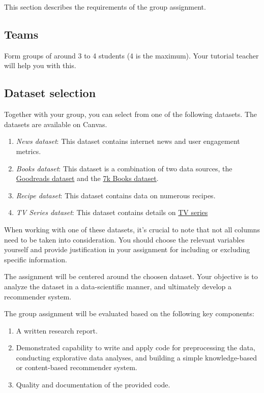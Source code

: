 This section describes the requirements of the group assignment. 

\subsection*{Teams}

Form groups of around 3 to 4 students (4 is the maximum). Your tutorial teacher will help you with this.

\subsection*{Dataset selection}
Together with your group, you can select from one of the following datasets. The datasets are available on Canvas. 

\begin{enumerate}
	\item \emph{News dataset}: This dataset contains internet news and user engagement metrics. 
 	\item \emph{Books dataset}: This dataset is a combination of two data sources, the \href{https://www.kaggle.com/datasets/jealousleopard/goodreadsbooks?resource=download}{Goodreads dataset} and the \href{https://www.kaggle.com/datasets/dylanjcastillo/7k-books-with-metadata}{7k Books dataset}.
	\item \emph{Recipe dataset}: This dataset contains data on numerous recipes. 
	\item \emph{TV Series dataset}: This dataset contains details on \href{https://www.kaggle.com/datasets/bourdier/all-tv-series-details-dataset}{TV series}
\end{enumerate}

When working with one of these datasets, it's crucial to note that not all columns need to be taken into consideration. You should choose the relevant variables yourself and provide justification in your assignment for including or excluding specific information.

The assignment will be centered around the choosen dataset. Your objective is to analyze the dataset in a data-scientific manner, and ultimately develop a recommender system.

The group assignment will be evaluated based on the following key components:

\begin{enumerate}
\item A written research report.
\item Demonstrated capability to write and apply code for preprocessing the data, conducting explorative data analyses, and building a simple knowledge-based or content-based recommender system.
\item Quality and documentation of the provided code.
\end{enumerate}


